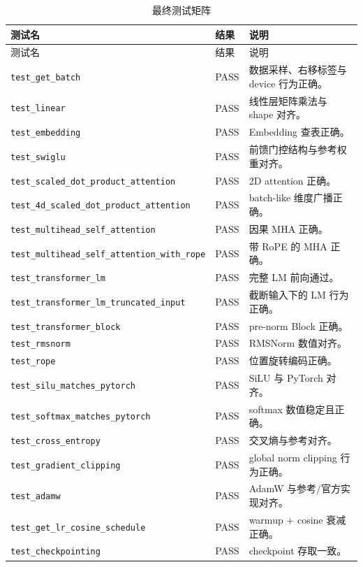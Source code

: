 \documentclass[UTF8,a4paper,11pt]{ctexart}
\begin{document}
\footnotesize
\begin{longtable}{p{} p{} p{}}
\caption{最终测试矩阵}\label{tab:all-tests}\\
\toprule
测试名 & 结果 & 说明 \\
\midrule
\endfirsthead
\toprule
测试名 & 结果 & 说明 \\
\midrule
\endhead
\texttt{test\_get\_batch} & PASS & 数据采样、右移标签与 device 行为正确。 \\
\texttt{test\_linear} & PASS & 线性层矩阵乘法与 shape 对齐。 \\
\texttt{test\_embedding} & PASS & Embedding 查表正确。 \\
\texttt{test\_swiglu} & PASS & 前馈门控结构与参考权重对齐。 \\
\texttt{test\_scaled\_dot\_product\_attention} & PASS & 2D attention 正确。 \\
\texttt{test\_4d\_scaled\_dot\_product\_attention} & PASS & batch-like 维度广播正确。 \\
\texttt{test\_multihead\_self\_attention} & PASS & 因果 MHA 正确。 \\
\texttt{test\_multihead\_self\_attention\_with\_rope} & PASS & 带 RoPE 的 MHA 正确。 \\
\texttt{test\_transformer\_lm} & PASS & 完整 LM 前向通过。 \\
\texttt{test\_transformer\_lm\_truncated\_input} & PASS & 截断输入下的 LM 行为正确。 \\
\texttt{test\_transformer\_block} & PASS & pre-norm Block 正确。 \\
\texttt{test\_rmsnorm} & PASS & RMSNorm 数值对齐。 \\
\texttt{test\_rope} & PASS & 位置旋转编码正确。 \\
\texttt{test\_silu\_matches\_pytorch} & PASS & SiLU 与 PyTorch 对齐。 \\
\texttt{test\_softmax\_matches\_pytorch} & PASS & softmax 数值稳定且正确。 \\
\texttt{test\_cross\_entropy} & PASS & 交叉熵与参考对齐。 \\
\texttt{test\_gradient\_clipping} & PASS & global norm clipping 行为正确。 \\
\texttt{test\_adamw} & PASS & AdamW 与参考/官方实现对齐。 \\
\texttt{test\_get\_lr\_cosine\_schedule} & PASS & warmup + cosine 衰减正确。 \\
\texttt{test\_checkpointing} & PASS & checkpoint 存取一致。 \\

\end{longtable}
\end{document}
